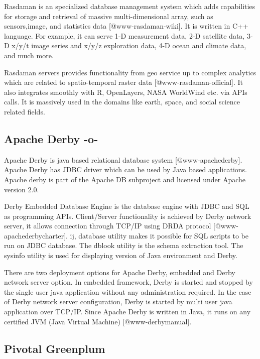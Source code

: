 Rasdaman is an specialized database management system which adds
capabilities for storage and retrieval of massive multi-dimensional
array, such as sensors,image, and statistics data
[@www-rasdaman-wiki]. It is written in C++ language. For
example, it can serve 1-D measurement data, 2-D satellite data, 3-D
x/y/t image series and x/y/z exploration data, 4-D ocean and climate
data, and much more.

Rasdaman servers provides functionality from geo service up to complex
analytics which are related to spatio-temporal raster
data [@www-rasdaman-official].  It also integrates smoothly with
R, OpenLayers, NASA WorldWind etc. via APIs calls. It is massively
used in the domains like earth, space, and social science related
fields.


     
\subsection{Apache Derby -o-}

Apache Derby is java based relational database
system [@www-apachederby]. Apache Derby has JDBC driver which can
be used by Java based applications. Apache derby is part of the Apache
DB subproject and licensed under Apache version 2.0.

Derby Embedded Database Engine is the database engine with JDBC and
SQL as programming APIs.  Client/Server functionality is achieved by
Derby network server, it allows connection through TCP/IP using DRDA
protocol [@www-apachederbycharter]. ij, database utility makes it
possible for SQL scripts to be run on JDBC database. The dblook
utility is the schema extraction tool. The sysinfo utility is used for
displaying version of Java environment and Derby.

There are two deployment options for Apache Derby, embedded and Derby
network server option. In embedded framework, Derby is started and
stopped by the single user java application without any administration
required. In the case of Derby network server configuration, Derby is
started by multi user java application over TCP/IP. Since Apache Derby
is written in Java, it runs on any certified JVM (Java Virtual
Machine) [@www-derbymanual].


      
\subsection{Pivotal Greenplum}

